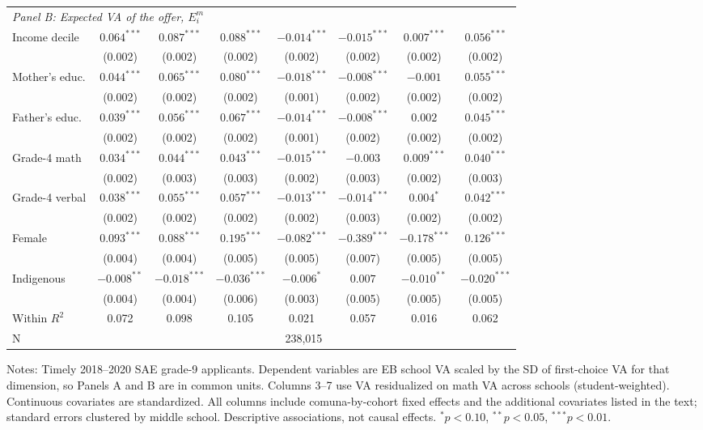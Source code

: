 \begin{table}[!htbp]
{\begin{tabular}{lccccccc}
\midrule
\multicolumn{8}{l}{\textit{Panel B: Expected VA of the offer, $E_i^m$}} \\
Income decile & $0.064^{***}$ & $0.087^{***}$ & $0.088^{***}$ & $-0.014^{***}$ & $-0.015^{***}$ & $0.007^{***}$ & $0.056^{***}$ \\
 & (0.002) & (0.002) & (0.002) & (0.002) & (0.002) & (0.002) & (0.002) \\
Mother's educ. & $0.044^{***}$ & $0.065^{***}$ & $0.080^{***}$ & $-0.018^{***}$ & $-0.008^{***}$ & $-0.001$ & $0.055^{***}$ \\
 & (0.002) & (0.002) & (0.002) & (0.001) & (0.002) & (0.002) & (0.002) \\
Father's educ. & $0.039^{***}$ & $0.056^{***}$ & $0.067^{***}$ & $-0.014^{***}$ & $-0.008^{***}$ & $0.002$ & $0.045^{***}$ \\
 & (0.002) & (0.002) & (0.002) & (0.001) & (0.002) & (0.002) & (0.002) \\
Grade-4 math & $0.034^{***}$ & $0.044^{***}$ & $0.043^{***}$ & $-0.015^{***}$ & $-0.003$ & $0.009^{***}$ & $0.040^{***}$ \\
 & (0.002) & (0.003) & (0.003) & (0.002) & (0.003) & (0.002) & (0.003) \\
Grade-4 verbal & $0.038^{***}$ & $0.055^{***}$ & $0.057^{***}$ & $-0.013^{***}$ & $-0.014^{***}$ & $0.004^{*}$ & $0.042^{***}$ \\
 & (0.002) & (0.002) & (0.002) & (0.002) & (0.003) & (0.002) & (0.002) \\
Female & $0.093^{***}$ & $0.088^{***}$ & $0.195^{***}$ & $-0.082^{***}$ & $-0.389^{***}$ & $-0.178^{***}$ & $0.126^{***}$ \\
 & (0.004) & (0.004) & (0.005) & (0.005) & (0.007) & (0.005) & (0.005) \\
Indigenous & $-0.008^{**}$ & $-0.018^{***}$ & $-0.036^{***}$ & $-0.006^{*}$ & $0.007$ & $-0.010^{**}$ & $-0.020^{***}$ \\
 & (0.004) & (0.004) & (0.006) & (0.003) & (0.005) & (0.005) & (0.005) \\
Within $R^2$ & 0.072 & 0.098 & 0.105 & 0.021 & 0.057 & 0.016 & 0.062 \\
\midrule
N & \multicolumn{7}{c}{238,015} \\
\bottomrule
\end{tabular}
}
\par\medskip\footnotesize
\begin{minipage}{\textwidth}
Notes: Timely 2018--2020 SAE grade-9 applicants. Dependent variables are EB school VA scaled by the SD of first-choice VA for that dimension, so Panels A and B are in common units. Columns 3--7 use VA residualized on math VA across schools (student-weighted). Continuous covariates are standardized. All columns include comuna-by-cohort fixed effects and the additional covariates listed in the text; standard errors clustered by middle school. Descriptive associations, not causal effects. $^{*}p<0.10$, $^{**}p<0.05$, $^{***}p<0.01$.
\end{minipage}
\end{table}
